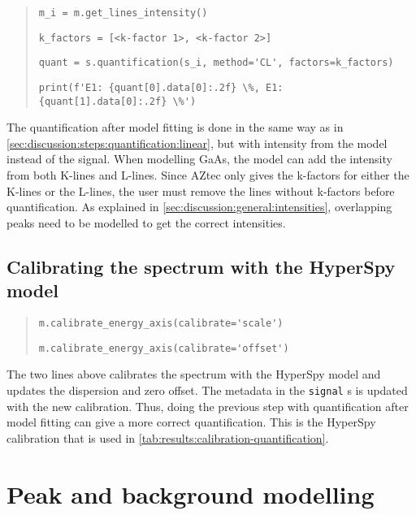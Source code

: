 \begin{quote}
    \verb|m_i = m.get_lines_intensity()|

    \verb|k_factors = [<k-factor 1>, <k-factor 2>] |

    \verb|quant = s.quantification(s_i, method='CL', factors=k_factors)|

    \verb|print(f'E1: {quant[0].data[0]:.2f} \%, E1: {quant[1].data[0]:.2f} \%')|

\end{quote}

The quantification after model fitting is done in the same way as in \cref{sec:discussion:steps:quantification:linear}, but with intensity from the model instead of the signal.
When modelling GaAs, the model can add the intensity from both K-lines and L-lines.
Since AZtec only gives the k-factors for either the K-lines or the L-lines, the user must remove the lines without k-factors before quantification.
As explained in \cref{sec:discussion:general:intensities}, overlapping peaks need to be modelled to get the correct intensities.


\subsection{Calibrating the spectrum with the HyperSpy model}
\label{sec:discussion:steps:HyperSpycalibration}

\begin{quote}

    \verb|m.calibrate_energy_axis(calibrate='scale')|

    \verb|m.calibrate_energy_axis(calibrate='offset')|

\end{quote}

The two lines above calibrates the spectrum with the HyperSpy model and updates the dispersion and zero offset.
The metadata in the \verb|signal| s is updated with the new calibration.
Thus, doing the previous step with quantification after model fitting can give a more correct quantification.
This is the HyperSpy calibration that is used in \cref{tab:results:calibration-quantification}.

\section{Peak and background modelling}
\label{sec:discussion:modelling}

